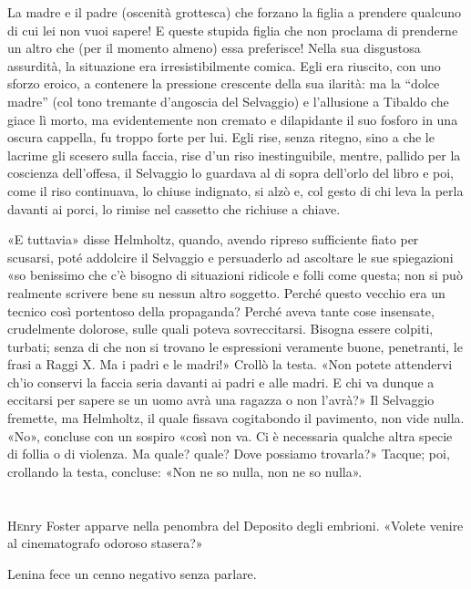 \documentclass[
a5paper, %
10pt, %
twoside, 
onecolumn, %
openany, %
]{memoir}
\begin{document}
La madre e il padre (oscenità grottesca) che forzano la figlia a prendere qualcuno di cui lei non vuoi sapere! E queste stupida figlia che non proclama di prenderne un altro che (per il momento almeno) essa preferisce! Nella sua disgustosa assurdità, la situazione era irresistibilmente comica. Egli era riuscito, con uno sforzo eroico, a contenere la pressione crescente della sua ilarità: ma la “dolce madre” (col tono tremante d’angoscia del Selvaggio) e l’allusione a Tibaldo che giace lì morto, ma evidentemente non cremato e dilapidante il suo fosforo in una oscura cappella, fu troppo forte per lui. Egli rise, senza ritegno, sino a che le lacrime gli scesero sulla faccia, rise d’un riso inestinguibile, mentre, pallido per la coscienza dell’offesa, il Selvaggio lo guardava al di sopra dell’orlo del libro e poi, come il riso continuava, lo chiuse indignato, si alzò e, col gesto di chi leva la perla davanti ai porci, lo rimise nel cassetto che richiuse a chiave.

«E tuttavia» disse Helmholtz, quando, avendo ripreso sufficiente fiato per scusarsi, poté addolcire il Selvaggio e persuaderlo ad ascoltare le sue spiegazioni «so benissimo che c’è bisogno di situazioni ridicole e folli come questa; non si può realmente scrivere bene su nessun altro soggetto. Perché questo vecchio era un tecnico così portentoso della propaganda? Perché aveva tante cose insensate, crudelmente dolorose, sulle quali poteva sovreccitarsi. Bisogna essere colpiti, turbati; senza di che non si trovano le espressioni veramente buone, penetranti, le frasi a Raggi X. Ma i padri e le madri!» Crollò la testa. «Non potete attendervi ch’io conservi la faccia seria davanti ai padri e alle madri. E chi va dunque a eccitarsi per sapere se un uomo avrà una ragazza o non l’avrà?» Il Selvaggio fremette, ma Helmholtz, il quale fissava cogitabondo il pavimento, non vide nulla. «No», concluse con un sospiro «così non va. Ci è necessaria qualche altra specie di follia o di violenza. Ma quale? quale? Dove possiamo trovarla?» Tacque; poi, crollando la testa, concluse: «Non ne so nulla, non ne so nulla».

\chapter{\phantom{title}}

\lettrine{H}enry Foster apparve nella penombra del Deposito degli embrioni. «Volete venire al cinematografo odoroso stasera?»

Lenina fece un cenno negativo senza parlare.
\end{document}
